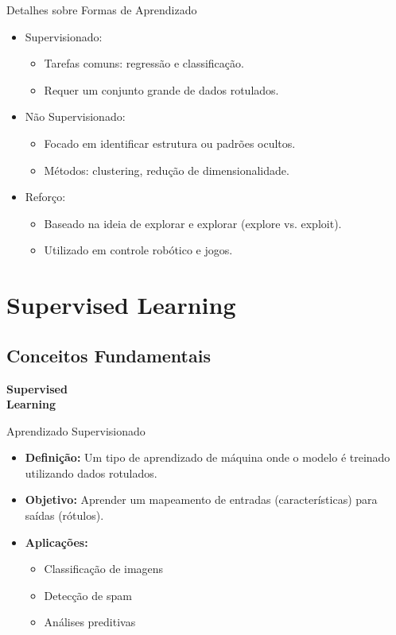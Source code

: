 \documentclass{beamer}
\begin{document}
\begin{frame}{Detalhes sobre Formas de Aprendizado}
  \begin{itemize}
    \item Supervisionado:
    \begin{itemize}
        \item Tarefas comuns: regressão e classificação.
        \item Requer um conjunto grande de dados rotulados.
    \end{itemize}
    \item Não Supervisionado:
    \begin{itemize}
        \item Focado em identificar estrutura ou padrões ocultos.
        \item Métodos: clustering, redução de dimensionalidade.
    \end{itemize}
    \item Reforço:
    \begin{itemize}
        \item Baseado na ideia de explorar e explorar (explore vs. exploit).
        \item Utilizado em controle robótico e jogos.
    \end{itemize}
  \end{itemize}
\end{frame}

\section{Supervised Learning}
\subsection{Conceitos Fundamentais}
\begin{frame}
\centering
\Huge
\textbf{Supervised\\ Learning}
\end{frame}

\begin{frame}{Aprendizado Supervisionado}
    \begin{itemize}
        \item \textbf{Definição:} Um tipo de aprendizado de máquina onde o modelo é treinado utilizando dados rotulados.
        \item \textbf{Objetivo:} Aprender um mapeamento de entradas (características) para saídas (rótulos).
        \item \textbf{Aplicações:}
        \begin{itemize}
            \item Classificação de imagens
            \item Detecção de spam
            \item Análises preditivas
        \end{itemize}
    \end{itemize}
\end{frame}
\end{document}
